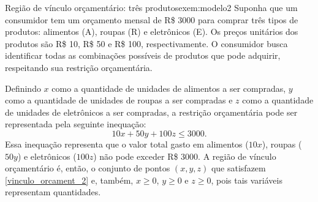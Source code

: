 \begin{example}{Região de vínculo orçamentário: três produtos}{exem:modelo2}
Suponha que um consumidor tem um orçamento mensal de R\$ 3000 para  comprar três tipos de produtos: alimentos (A), roupas (R) e eletrônicos (E). Os preços unitários dos produtos são R\$ 10, R\$ 50 e R\$ 100, respectivamente. O consumidor busca identificar todas as combinações possíveis de produtos que pode adquirir, respeitando sua restrição orçamentária. 

\solution

Definindo \(x\) como a quantidade de unidades de alimentos a ser compradas, \(y\) como a quantidade de unidades de roupas a ser compradas e \(z\) como a quantidade de unidades de eletrônicos a ser compradas, a restrição orçamentária pode ser representada pela seguinte inequação:
\begin{equation}\label{vinculo_orcament_2}
10x + 50y + 100z \leq 3000.
\end{equation}
Essa inequação representa que o valor total gasto em alimentos (\(10x\)), roupas (\(50y\)) e eletrônicos (\(100z\)) não pode exceder R\$ 3000. 
A região de vínculo orçamentário é, então, o conjunto de pontos \((x, y, z)\) que satisfazem \eqref{vinculo_orcament_2} e, também, $x\geq 0$, $y\geq0$ e $z\geq 0$, pois tais variáveis representam quantidades. 

\begin{center}
\end{center}
\end{example}
